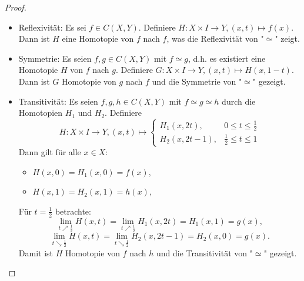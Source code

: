 \documentclass[a4paper,11pt,notitlepage]{report}
\begin{document}
\begin{proof}
	\begin{itemize}
		\item Reflexivität: Es sei $f \in C(X,Y)$.
			Definiere $H \colon X \times I \rightarrow Y, (x,t) \mapsto f(x)$.
			Dann ist $H$ eine Homotopie von $f$ nach $f$, was die Reflexivität von "$\simeq$" zeigt.
		\item Symmetrie: Es seien $f,g \in C(X,Y)$ mit $f \simeq g$, d.h. es existiert eine Homotopie $H$ von $f$ nach $g$. Definiere $G \colon X \times I \rightarrow Y, (x,t) \mapsto H(x,1-t)$.
		Dann ist $G$ Homotopie von $g$ nach $f$ und die Symmetrie von "$\simeq$" gezeigt.
		\item Transitivität: Es seien $f,g,h \in C(X,Y)$ mit $f \simeq g \simeq h$ durch die Homotopien $H_1$ und $H_2$. Definiere 
			$$H \colon X \times I \rightarrow Y, (x,t) \mapsto \begin{cases} H_1(x,2t),& 0 \leq t \leq \frac{1}{2} \\ H_2(x,2t-1), & \frac{1}{2} \leq t \leq 1 \end{cases}$$
			Dann gilt für alle $x \in X$:
			\begin{itemize}
				\item $H(x,0) = H_1(x,0)=f(x),$
				\item $H(x,1) = H_2(x,1)=h(x),$
			\end{itemize}
			Für $t = \frac{1}{2}$ betrachte:
			$$\lim\limits_{t \nearrow \frac{1}{2}}{H(x,t)} = \lim\limits_{t \nearrow \frac{1}{2}}{H_1(x,2t)} = H_1(x,1) = g(x),$$
			$$\lim\limits_{t \searrow \frac{1}{2}}{H(x,t)} = \lim\limits_{t \searrow \frac{1}{2}}{H_2(x,2t-1)}=H_2(x,0)=g(x).$$
			Damit ist $H$ Homotopie von $f$ nach $h$ und die Transitivität von "$\simeq$" gezeigt.
	\end{itemize}
\end{proof}
\end{document}
